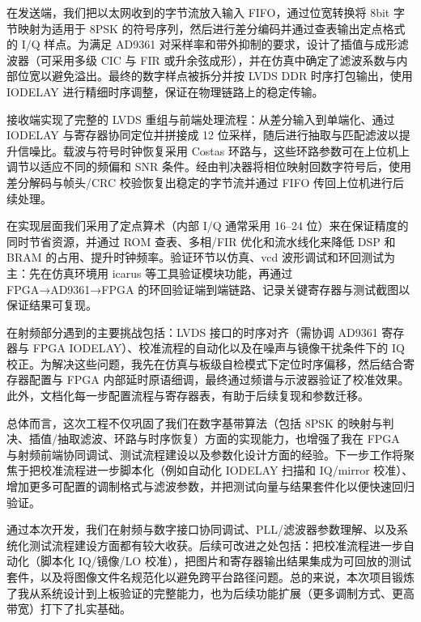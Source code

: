 \documentclass[10pt, a4paper]{article}
\begin{document}
在发送端，我们把以太网收到的字节流放入输入 FIFO，通过位宽转换将 8bit 字节映射为适用于 8PSK 的符号序列，然后进行差分编码并通过查表输出定点格式的 I/Q 样点。为满足 AD9361 对采样率和带外抑制的要求，设计了插值与成形滤波器（可采用多级 CIC 与 FIR 或升余弦成形），并在仿真中确定了滤波系数与内部位宽以避免溢出。最终的数字样点被拆分并按 LVDS DDR 时序打包输出，使用 IODELAY 进行精细时序调整，保证在物理链路上的稳定传输。

接收端实现了完整的 LVDS 重组与前端处理流程：从差分输入到单端化、通过 IODELAY 与寄存器协同定位并拼接成 12 位采样，随后进行抽取与匹配滤波以提升信噪比。载波与符号时钟恢复采用 Costas 环路与，这些环路参数可在上位机上调节以适应不同的频偏和 SNR 条件。经由判决器将相位映射回数字符号后，使用差分解码与帧头/CRC 校验恢复出稳定的字节流并通过 FIFO 传回上位机进行后续处理。

在实现层面我们采用了定点算术（内部 I/Q 通常采用 16–24 位）来在保证精度的同时节省资源，并通过 ROM 查表、多相/FIR 优化和流水线化来降低 DSP 和 BRAM 的占用、提升时钟频率。验证环节以仿真、vcd 波形调试和环回测试为主：先在仿真环境用 icarus 等工具验证模块功能，再通过 FPGA→AD9361→FPGA 的环回验证端到端链路、记录关键寄存器与测试截图以保证结果可复现。

在射频部分遇到的主要挑战包括：LVDS 接口的时序对齐（需协调 AD9361 寄存器与 FPGA IODELAY）、校准流程的自动化以及在噪声与镜像干扰条件下的 IQ 校正。为解决这些问题，我先在仿真与板级自检模式下定位时序偏移，然后结合寄存器配置与 FPGA 内部延时原语细调，最终通过频谱与示波器验证了校准效果。此外，文档化每一步配置流程与寄存器表，有助于后续复现和参数迁移。

总体而言，这次工程不仅巩固了我们在数字基带算法（包括 8PSK 的映射与判决、插值/抽取滤波、环路与时序恢复）方面的实现能力，也增强了我在 FPGA 与射频前端协同调试、测试流程建设以及参数化设计方面的经验。下一步工作将聚焦于把校准流程进一步脚本化（例如自动化 IODELAY 扫描和 IQ/mirror 校准）、增加更多可配置的调制格式与滤波参数，并把测试向量与结果套件化以便快速回归验证。

通过本次开发，我们在射频与数字接口协同调试、PLL/滤波器参数理解、以及系统化测试流程建设方面都有较大收获。后续可改进之处包括：把校准流程进一步自动化（脚本化 IQ/镜像/LO 校准），把图片和寄存器输出结果集成为可回放的测试套件，以及将图像文件名规范化以避免跨平台路径问题。总的来说，本次项目锻炼了我从系统设计到上板验证的完整能力，也为后续功能扩展（更多调制方式、更高带宽）打下了扎实基础。

\end{document}
